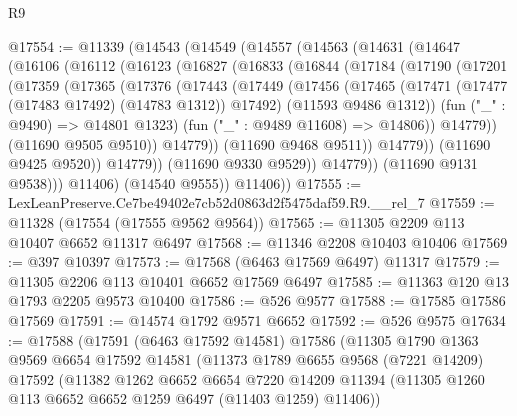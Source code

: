 \begin{lexlean}{R9}
\begin{coremodule}
@17554 := @11339
    (@14543
      (@14549
        (@14557
          (@14563
            (@14631
              (@14647
                (@16106
                  (@16112
                    (@16123
                      (@16827
                        (@16833
                          (@16844
                            (@17184
                              (@17190
                                (@17201
                                  (@17359
                                    (@17365
                                      (@17376
                                        (@17443
                                          (@17449
                                            (@17456
                                              (@17465
                                                (@17471
                                                  (@17477 (@17483 @17492) (@14783 @1312))
                                                  @17492)
                                                (@11593 @9486 @1312))
                                              (fun ("_" : @9490) => @14801 @1323)
                                              (fun ("_" : @9489 @11608) => @14806))
                                            @14779))
                                        (@11690 @9505 @9510))
                                      @14779))
                                  (@11690 @9468 @9511))
                                @14779))
                            (@11690 @9425 @9520))
                          @14779))
                      (@11690 @9330 @9529))
                    @14779))
                (@11690 @9131 @9538)))
            @11406)
          (@14540 @9555))
        @11406))
@17555 := LexLeanPreserve.Ce7be49402e7cb52d0863d2f5475daf59.R9.__rel_7
@17559 := @11328 (@17554 (@17555 @9562 @9564))
@17565 := @11305 @2209 @113 @10407 @6652 @11317 @6497
@17568 := @11346 @2208 @10403 @10406
@17569 := @397 @10397
@17573 := @17568 (@6463 @17569 @6497) @11317
@17579 := @11305 @2206 @113 @10401 @6652 @17569 @6497
@17585 := @11363 @120 @13 @1793 @2205 @9573 @10400
@17586 := @526 @9577
@17588 := @17585 @17586 @17569
@17591 := @14574 @1792 @9571 @6652
@17592 := @526 @9575
@17634 := @17588
    (@17591
      (@6463 @17592 @14581)
      @17586
      (@11305
        @1790
        @1363
        @9569
        @6654
        @17592
        @14581
        (@11373
          @1789
          @6655
          @9568
          (@7221 @14209)
          @17592
          (@11382
            @1262
            @6652
            @6654
            @7220
            @14209
            @11394
            (@11305 @1260 @113 @6652 @6652 @1259 @6497 (@11403 @1259) @11406))

\end{coremodule}
\end{lexlean}
